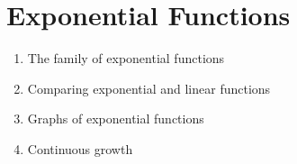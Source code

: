 
\chapter{Exponential Functions}

\begin{enumerate}
\item The family of exponential functions

\item Comparing exponential and linear functions

\item Graphs of exponential functions

\item Continuous growth
\end{enumerate}
